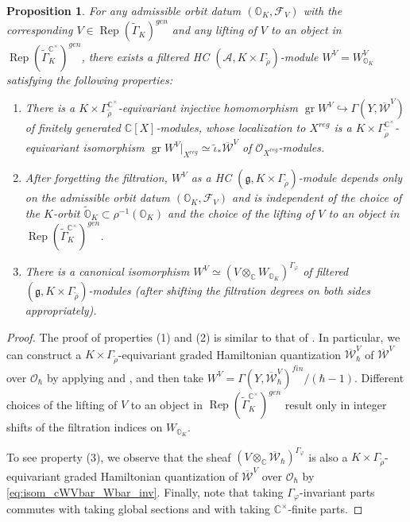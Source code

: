 \documentclass[11pt, a4paper]{amsart}
\newcommand{\C}{\mathbb{C}}
\newcommand{\A}{\mathcal{A}}
\newcommand{\g}{\mathfrak{g}}
\newcommand{\orb}{\mathbb{O}}
\newcommand{\orbk}{\orb_{K}}
\newcommand{\torbk}{\widetilde{\orb}_{K}}
\newcommand{\gr}{\operatorname{gr}}
\newcommand{\cF}{\mathcal{F}}
\newcommand{\cW}{\mathcal{W}}
\newcommand{\hb}{\hbar}
\newcommand{\WV}{W^{\scriptscriptstyle V}}
\newcommand{\cWVbar}{\overline{\cW}^{\scriptscriptstyle V}}
\newcommand{\tGamma}{\widetilde{\Gamma}}
\DeclareMathOperator{\Rep}{Rep}
\newcommand{\cm}{\C^\times}
\newcommand{\OO}{\mathcal{O}}
\newtheorem{Prop}[Thm]{Proposition}
\theoremstyle{definition}
\numberwithin{equation}{section}
\begin{document}
\begin{Prop} \label{prop:quant_cWV}
	For any admissible orbit datum $(\orbk, \cF_V)$ with the corresponding $V \in \Rep(\tGamma_K)^{gen}$ and any lifting of $V$ to an object in $\Rep(\tGamma_K^{\cm})^{gen}$, there exists a filtered HC $(\A, K \times \Gamma_{\tilde{\rho}})$-module $\WV = \WV_{\orbk}$ satisfying the following properties:
    \begin{enumerate}
        \item There is a $K \times \Gamma_{\tilde{\rho}}^{\cm}$-equivariant injective homomorphism $\gr \WV \hookrightarrow \Gamma(Y,\cWVbar)$ of finitely generated $\C[X]$-modules, whose localization to $X^{reg}$ is a $K \times \Gamma_{\tilde{\rho}}^{\cm}$-equivariant isomorphism $\gr \WV|_{X^{reg}} \simeq \tilde{\iota}_* \cWVbar$ of $\OO_{X^{reg}}$-modules.
        \item After forgetting the filtration, $\WV$ as a HC $(\g, K \times \Gamma_{\tilde{\rho}})$-module depends only on the admissible orbit datum $(\orbk, \cF_V)$ and is independent of the choice of the $K$-orbit $\torbk \subset \rho^{-1}(\orbk)$ and the choice of the lifting of $V$ to an object in $\Rep(\tGamma_K^{\cm})^{gen}$.
        \item There is a canonical isomorphism $\WV \simeq (V \otimes_\C W_{\orbk})^{\Gamma_\varphi}$ of filtered $(\g, K \times \Gamma_{\tilde{\rho}})$-modules (after shifting the filtration degrees on both sides appropriately).
    \end{enumerate}  
\end{Prop}
 
\begin{proof}
    The proof of properties (1) and (2) is similar to that of . In particular, we can construct a $K \times \Gamma_{\tilde{\rho}}$-equivariant graded Hamiltonian quantization $\cWVbar_\hb$ of $\cWVbar$ over $\OO_\hb$ by applying  and , and then take $\WV = \Gamma(Y, \cWVbar_\hb)^{fin}/(\hb-1)$. Different choices of the lifting of $V$ to an object in $\Rep(\tGamma_K^{\cm})^{gen}$ result only in integer shifts of the filtration indices on $W_{\orbk}$.

	To see property (3), we observe that the sheaf $(V \otimes_\C \overline{\cW}_\hb)^{\Gamma_\varphi}$ is also a $K \times \Gamma_{\tilde{\rho}}$-equivariant graded Hamiltonian quantization of $\cWVbar$ over $\OO_\hb$ by \eqref{eq:isom_cWVbar_Wbar_inv}. Finally, note that taking $\Gamma_\varphi$-invariant parts commutes with taking global sections and with taking $\cm$-finite parts.
\end{proof}
\end{document}
